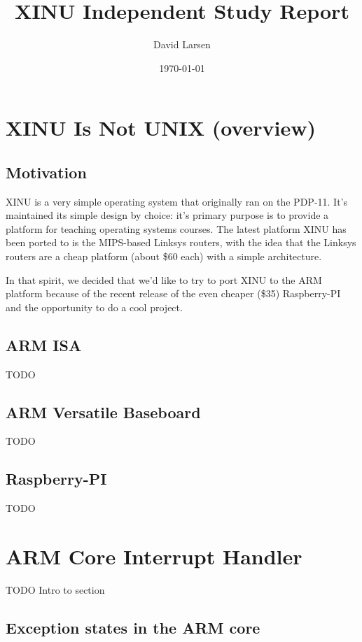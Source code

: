 \documentclass[12pt]{article}
\title{XINU Independent Study Report}
\author{David Larsen}
\date{\today}
\newcommand{\TODO}[1]{{\huge\color{red}TODO \Large #1}}
\begin{document}
\maketitle

\tableofcontents

\section{XINU Is Not U{\small NIX} (overview)}

\subsection{Motivation}

XINU is a very simple operating system that originally ran on the PDP-11. It's
maintained its simple design by choice: it's primary purpose is to provide a
platform for teaching operating systems courses. The latest platform XINU has
been ported to is the MIPS-based Linksys routers, with the idea that the
Linksys routers are a cheap platform (about \$60 each) with a simple
architecture.

In that spirit, we decided that we'd like to try to port XINU to the ARM
platform because of the recent release of the even cheaper (\$35) Raspberry-PI
and the opportunity to do a cool project.

\subsection{ARM ISA}

\TODO{}

\subsection{ARM Versatile Baseboard}

\TODO{}

\subsection{Raspberry-PI}

\TODO{}

\section{ARM Core Interrupt Handler}

\TODO{Intro to section}

\subsection{Exception states in the ARM core}
\end{document}
